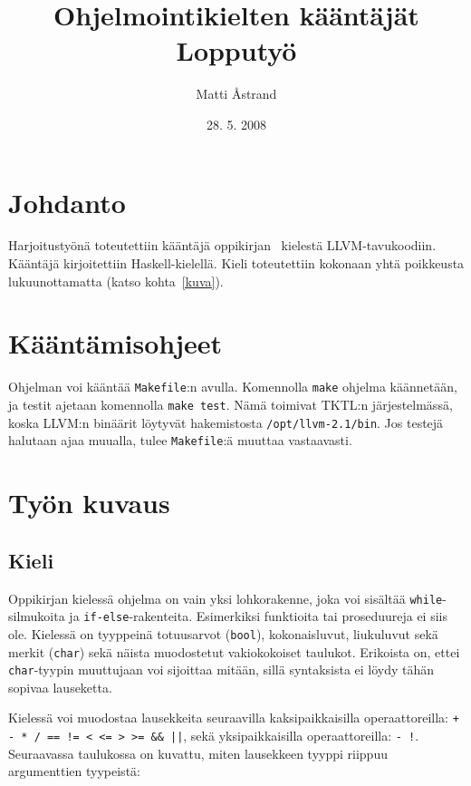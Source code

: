 \documentclass[12pt]{article}
\title{Ohjelmointikielten kääntäjät \\ Lopputyö}
\author{Matti Åstrand}
\date{28. 5. 2008}
\newcommand{\code}{\texttt}
\begin{document}
\maketitle

\section{Johdanto}
Harjoitustyönä toteutettiin kääntäjä oppikirjan~\cite{dragon} kielestä LLVM-tavukoodiin. 
Kääntäjä kirjoitettiin Haskell-kielellä.
Kieli toteutettiin kokonaan yhtä poikkeusta lukuunottamatta 
 (katso kohta~\ref{kuva}).

\section{Kääntämisohjeet}
Ohjelman voi kääntää \code{Makefile}:n avulla. Komennolla \code{make} ohjelma 
käännetään, ja testit ajetaan komennolla \code{make test}. Nämä toimivat TKTL:n 
järjestelmässä, koska LLVM:n binäärit löytyvät hakemistosta \code{/opt/llvm-2.1/bin}. 
Jos testejä halutaan ajaa muualla, tulee \code{Makefile}:ä muuttaa vastaavasti.

\section{Työn kuvaus}
\subsection{Kieli}
Oppikirjan kielessä ohjelma on vain yksi lohkorakenne, joka voi sisältää 
\code{while}-silmukoita ja \code{if-else}-rakenteita. Esimerkiksi funktioita 
tai proseduureja ei siis ole. Kielessä on tyyppeinä totuusarvot (\code{bool}), 
kokonaisluvut, liukuluvut sekä merkit (\code{char}) sekä näista muodostetut 
vakiokokoiset taulukot. Erikoista on, ettei \code{char}-tyypin muuttujaan 
voi sijoittaa mitään, sillä syntaksista ei löydy tähän sopivaa lauseketta.

Kielessä voi muodostaa lausekkeita seuraavilla kaksipaikkaisilla 
operaattoreilla: 
\code{+ - * / == != < <= > >= \&\& ||}, sekä yksipaikkaisilla operaattoreilla: 
\code{- !}. Seuraavassa taulukossa on kuvattu, miten lausekkeen tyyppi 
riippuu argumenttien tyypeistä:
\end{document}
